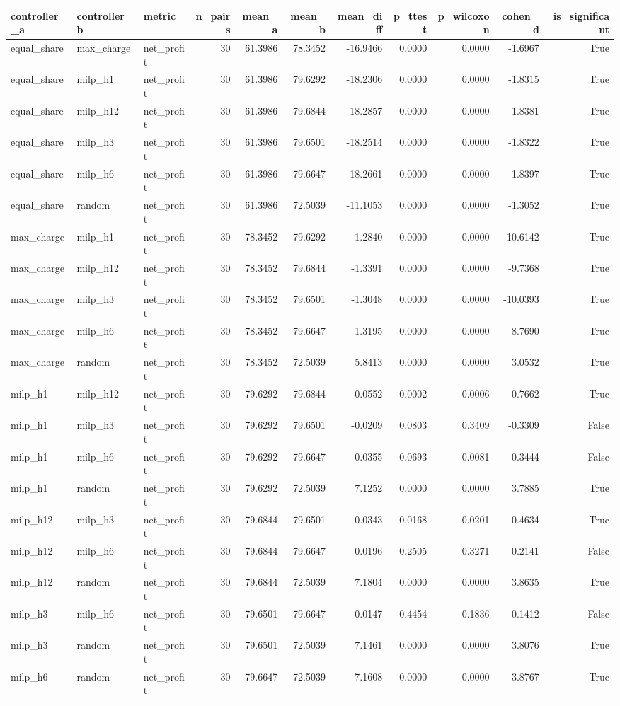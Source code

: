 \begin{tabular}{lllrrrrrrrr}
\toprule
controller_a & controller_b & metric & n_pairs & mean_a & mean_b & mean_diff & p_ttest & p_wilcoxon & cohen_d & is_significant \\
\midrule
equal_share & max_charge & net_profit & 30 & 61.3986 & 78.3452 & -16.9466 & 0.0000 & 0.0000 & -1.6967 & True \\
equal_share & milp_h1 & net_profit & 30 & 61.3986 & 79.6292 & -18.2306 & 0.0000 & 0.0000 & -1.8315 & True \\
equal_share & milp_h12 & net_profit & 30 & 61.3986 & 79.6844 & -18.2857 & 0.0000 & 0.0000 & -1.8381 & True \\
equal_share & milp_h3 & net_profit & 30 & 61.3986 & 79.6501 & -18.2514 & 0.0000 & 0.0000 & -1.8322 & True \\
equal_share & milp_h6 & net_profit & 30 & 61.3986 & 79.6647 & -18.2661 & 0.0000 & 0.0000 & -1.8397 & True \\
equal_share & random & net_profit & 30 & 61.3986 & 72.5039 & -11.1053 & 0.0000 & 0.0000 & -1.3052 & True \\
max_charge & milp_h1 & net_profit & 30 & 78.3452 & 79.6292 & -1.2840 & 0.0000 & 0.0000 & -10.6142 & True \\
max_charge & milp_h12 & net_profit & 30 & 78.3452 & 79.6844 & -1.3391 & 0.0000 & 0.0000 & -9.7368 & True \\
max_charge & milp_h3 & net_profit & 30 & 78.3452 & 79.6501 & -1.3048 & 0.0000 & 0.0000 & -10.0393 & True \\
max_charge & milp_h6 & net_profit & 30 & 78.3452 & 79.6647 & -1.3195 & 0.0000 & 0.0000 & -8.7690 & True \\
max_charge & random & net_profit & 30 & 78.3452 & 72.5039 & 5.8413 & 0.0000 & 0.0000 & 3.0532 & True \\
milp_h1 & milp_h12 & net_profit & 30 & 79.6292 & 79.6844 & -0.0552 & 0.0002 & 0.0006 & -0.7662 & True \\
milp_h1 & milp_h3 & net_profit & 30 & 79.6292 & 79.6501 & -0.0209 & 0.0803 & 0.3409 & -0.3309 & False \\
milp_h1 & milp_h6 & net_profit & 30 & 79.6292 & 79.6647 & -0.0355 & 0.0693 & 0.0081 & -0.3444 & False \\
milp_h1 & random & net_profit & 30 & 79.6292 & 72.5039 & 7.1252 & 0.0000 & 0.0000 & 3.7885 & True \\
milp_h12 & milp_h3 & net_profit & 30 & 79.6844 & 79.6501 & 0.0343 & 0.0168 & 0.0201 & 0.4634 & True \\
milp_h12 & milp_h6 & net_profit & 30 & 79.6844 & 79.6647 & 0.0196 & 0.2505 & 0.3271 & 0.2141 & False \\
milp_h12 & random & net_profit & 30 & 79.6844 & 72.5039 & 7.1804 & 0.0000 & 0.0000 & 3.8635 & True \\
milp_h3 & milp_h6 & net_profit & 30 & 79.6501 & 79.6647 & -0.0147 & 0.4454 & 0.1836 & -0.1412 & False \\
milp_h3 & random & net_profit & 30 & 79.6501 & 72.5039 & 7.1461 & 0.0000 & 0.0000 & 3.8076 & True \\
milp_h6 & random & net_profit & 30 & 79.6647 & 72.5039 & 7.1608 & 0.0000 & 0.0000 & 3.8767 & True \\
\bottomrule
\end{tabular}
